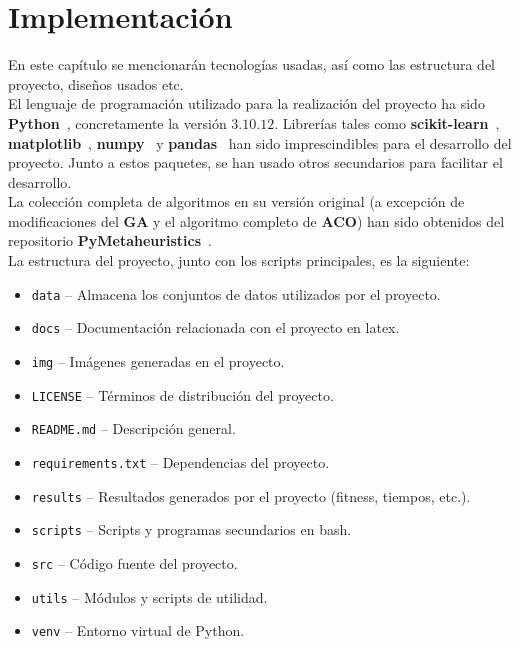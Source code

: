 \chapter{Implementación}
En este capítulo se mencionarán tecnologías usadas, así como las estructura del proyecto, diseños usados etc.\\[6pt]
El lenguaje de programación utilizado para la realización del proyecto ha sido \textbf{Python}~\cite{VanRossum2009}, concretamente la versión $3.10.12$. Librerías tales como \textbf{scikit-learn}~\cite{scikit-learn}, \textbf{matplotlib}~\cite{Hunter2007}, \textbf{numpy}~\cite{harris2020array} y \textbf{pandas}~\cite{reback2020pandas} han sido imprescindibles para el desarrollo del proyecto. Junto a estos paquetes, se han usado otros secundarios para facilitar el desarrollo.\\[6pt]
La colección completa de algoritmos en su versión original (a excepción de modificaciones del \textbf{GA} y el algoritmo completo de \textbf{ACO}) han sido obtenidos del repositorio \textbf{PyMetaheuristics}~\cite{valdecy_pyMetaheuristic}.\\[6pt]
La estructura del proyecto, junto con los scripts principales, es la siguiente:

\begin{itemize}
    \item \texttt{data} -- Almacena los conjuntos de datos utilizados por el proyecto.
    \item \texttt{docs} -- Documentación relacionada con el proyecto en latex.
    \item \texttt{img} -- Imágenes generadas en el proyecto.
    \item \texttt{LICENSE} -- Términos de distribución del proyecto.
    \item \texttt{README.md} -- Descripción general.
    \item \texttt{requirements.txt} -- Dependencias del proyecto.
    \item \texttt{results} -- Resultados generados por el proyecto (fitness, tiempos, etc.).
    \item \texttt{scripts} -- Scripts y programas secundarios en bash.
    \item \texttt{src} -- Código fuente del proyecto.
    \item \texttt{utils} -- Módulos y scripts de utilidad.
    \item \texttt{venv} -- Entorno virtual de Python.
\end{itemize}

